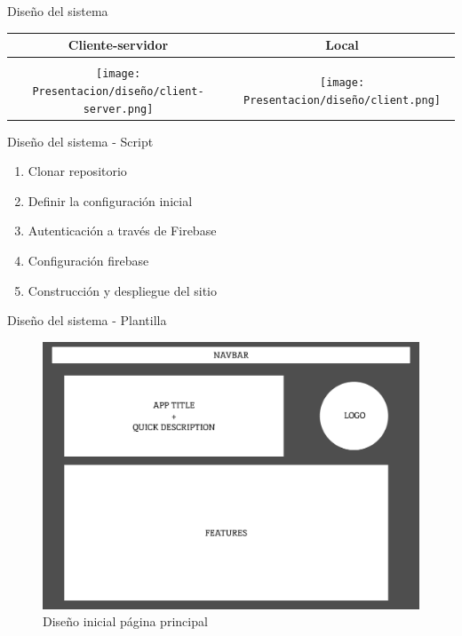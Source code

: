 \documentclass{beamer}
\begin{document}
    \begin{frame}{Diseño del sistema}

            \begin{center}
                \begin{table}[]
                    \begin{tabular}{c|c}
                         Cliente-servidor & Local \\ \hline
                         & \\
                         \texttt{[image: Presentacion/diseño/client-server.png]} & \texttt{[image: Presentacion/diseño/client.png]} \\
                    \end{tabular}
                \end{table}
                   
            \end{center}
        
    \end{frame}   

    \begin{frame}{Diseño del sistema - Script}
    
        \begin{enumerate}
            \item Clonar repositorio
            \item Definir la configuración inicial
            \item Autenticación a través de Firebase
            \item Configuración firebase
            \item Construcción y despliegue del sitio
        \end{enumerate}
        
    \end{frame}  

    \begin{frame}{Diseño del sistema - Plantilla}

        \begin{figure}
            \centering
            \includegraphics[width=.8\textwidth]{Presentacion/mockup/initial.png}
            \caption{Diseño inicial página principal}
        \end{figure}
        
    \end{frame}  
\end{document}
